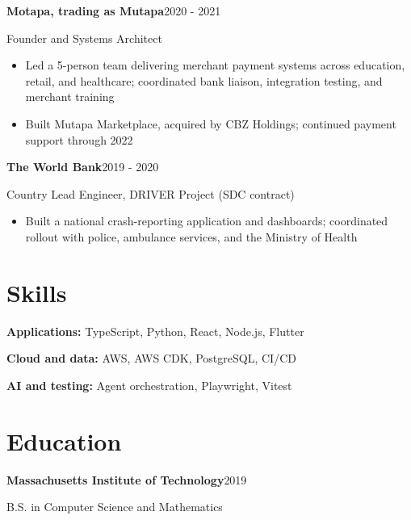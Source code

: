 \documentclass[11pt,a4paper]{article}
\newcommand{\role}[3]{\textbf{#1}\hfill #3\par #2\par}
\begin{document}
\role{Motapa, trading as Mutapa}{Founder and Systems Architect}{2020 - 2021}
\begin{itemize}
  \item Led a 5-person team delivering merchant payment systems across education, retail, and healthcare; coordinated bank liaison, integration testing, and merchant training
  \item Built Mutapa Marketplace, acquired by CBZ Holdings; continued payment support through 2022
\end{itemize}

\role{The World Bank}{Country Lead Engineer, DRIVER Project (SDC contract)}{2019 - 2020}
\begin{itemize}
  \item Built a national crash-reporting application and dashboards; coordinated rollout with police, ambulance services, and the Ministry of Health
\end{itemize}

\section{Skills}
\textbf{Applications:} TypeScript, Python, React, Node.js, Flutter\par
\textbf{Cloud and data:} AWS, AWS CDK, PostgreSQL, CI/CD\par
\textbf{AI and testing:} Agent orchestration, Playwright, Vitest

\section{Education}
\textbf{Massachusetts Institute of Technology}\hfill 2019\par
B.S. in Computer Science and Mathematics
\end{document}
